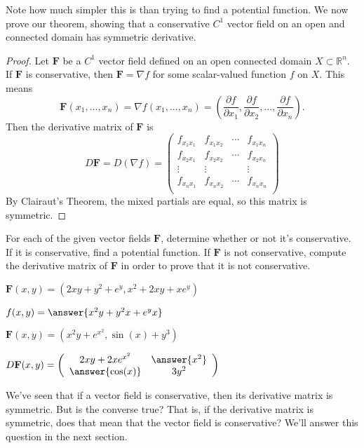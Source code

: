 \documentclass{ximera}
\begin{document}
Note how much simpler this is than trying to find a potential function. We now prove our theorem, showing that a conservative $C^1$ vector field on an open and connected domain has symmetric derivative.

\begin{proof}
Let $\mathbf{F}$ be a $C^1$ vector field defined on an open connected domain $X\subset\mathbb{R}^n$. If $\mathbf{F}$ is  conservative, then $\mathbf{F}=\nabla f$ for some scalar-valued function $f$ on $X$. This means
\[
\mathbf{F}(x_1,...,x_n) = \nabla f(x_1,...,x_n) = \left(\dfrac{\partial f}{\partial x_1}, \dfrac{\partial f}{\partial x_2}, ...,\dfrac{\partial f}{\partial x_n}\right).
\]
Then the derivative matrix of $\mathbf{F}$ is
\[
D\mathbf{F} = D(\nabla f) = \left(\begin{array}{cccc}
f_{x_1x_1} & f_{x_1x_2} & \cdots & f_{x_1x_n}\\
f_{x_2x_1} & f_{x_2x_2} & \cdots & f_{x_2x_n}\\
\vdots & \vdots & & \vdots\\
f_{x_nx_1} & f_{x_nx_2} & \cdots & f_{x_nx_n}\\
\end{array}\right)
\]
By Clairaut's Theorem, the mixed partials are equal, so this matrix is symmetric.
\end{proof}

For each of the given vector fields $\mathbf{F}$, determine whether or not it's conservative. If it is conservative, find a potential function. If $\mathbf{F}$ is not conservative, compute the derivative matrix of $\mathbf{F}$ in order to prove that it is not conservative.

\begin{problem}
$\mathbf{F}(x,y) = (2xy+y^2+e^y, x^2+2xy+xe^y)$
\begin{multipleChoice}
\end{multipleChoice}
\begin{problem}
$f(x,y)=\answer{x^2y+y^2x+e^yx}$
\end{problem}
\end{problem}

\begin{problem}
$\mathbf{F}(x,y) = (x^2y+e^{x^2},\sin(x)+y^3)$
\begin{multipleChoice}
\end{multipleChoice}
\begin{problem}
$D\mathbf{F}(x,y) = \left(\begin{array}{cc}2xy+2xe^{x^2}&\answer{x^2}\\\answer{\cos(x)}&3y^2\end{array}\right)$
\end{problem}
\end{problem}

We've seen that if a vector field is conservative, then its derivative matrix is symmetric. But is the converse true? That is, if the derivative matrix is symmetric, does that mean that the vector field is conservative? We'll answer this question in the next section.
\end{document}

